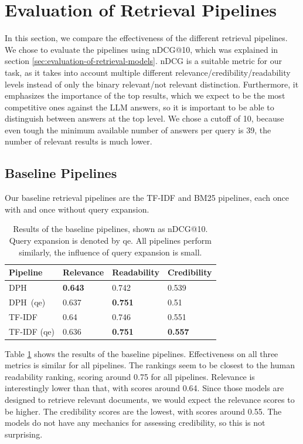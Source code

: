 \section{Evaluation of Retrieval Pipelines}
In this section, we compare the effectiveness of the different retrieval pipelines.
We chose to evaluate the pipelines using nDCG@10, which was explained in section \ref{sec:evaluation-of-retrieval-models}.
nDCG is a suitable metric for our task, as it takes into account multiple different relevance/credibility/readability levels instead of only the binary relevant/not relevant distinction.
Furthermore, it emphasizes the importance of the top results, which we expect to be the most competitive ones against the LLM answers, so it is important to be able to distinguish between answers at the top level.
We chose a cutoff of 10, because even tough the minimum available number of answers per query is 39, the number of relevant results is much lower.

\subsection{Baseline Pipelines}
Our baseline retrieval pipelines are the TF-IDF and BM25 pipelines, each once with and once without query expansion.
\begin{table}[tb]
\centering
\begin{tabularx}{\textwidth}{lXXX}
\hline
Pipeline    & Relevance          & Readability        & Credibility        \\ \hline
DPH         & \textbf{0.643} & 0.742 & 0.539 \\
DPH\ (qe)     & 0.637 & \textbf{0.751} & 0.51  \\
TF-IDF     & 0.64  & 0.746 & 0.551 \\
TF-IDF (qe) & 0.636 & \textbf{0.751} & \textbf{0.557} \\
\hline
\end{tabularx}
\caption{Results of the baseline pipelines, shown as nDCG@10. Query expansion is denoted by qe.
All pipelines perform similarly, the influence of query expansion is small.}
\label{tab:baseline_pipelines}
\end{table}
Table \ref{tab:baseline_pipelines} shows the results of the baseline pipelines.
Effectiveness on all three metrics is similar for all pipelines.
The rankings seem to be closest to the human readability ranking, scoring around 0.75 for all pipelines.
Relevance is interestingly lower than that, with scores around 0.64.
Since those models are designed to retrieve relevant documents, we would expect the relevance scores to be higher.
The credibility scores are the lowest, with scores around 0.55.
The models do not have any mechanics for assessing credibility, so this is not surprising.


